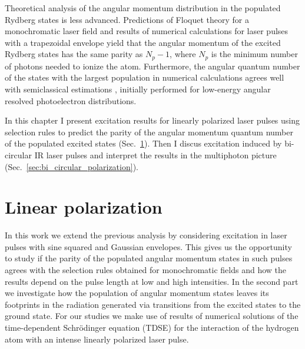 Theoretical analysis of the angular momentum distribution in the populated Rydberg states is less advanced. Predictions of Floquet theory for a monochromatic laser field \cite{krajewska12} and results of numerical calculations for laser pulses with a trapezoidal envelope \cite{piraux17} yield that the angular momentum of the excited Rydberg states has the same parity as $N_p-1$, where $N_p$ is the minimum number of photons needed to ionize the atom. Furthermore, the angular quantum number of the states with the largest population in numerical calculations \cite{li14,li14b,piraux17} agrees well with semiclassical estimations \cite{arbo08}, initially performed for low-energy angular resolved photoelectron distributions.

In this chapter I present excitation results for linearly polarized laser pulses using selection rules to predict the parity of the angular momentum quantum number of the populated excited states (Sec.~\ref{sec:linear_polarization}). Then I discus excitation induced by bi-circular IR laser pulses and interpret the results in the multiphoton picture (Sec.~\ref{sec:bi_circular_polarization}). 

\section{Linear polarization} %
\label{sec:linear_polarization}

In this work we extend the previous analysis by considering excitation in laser pulses with sine squared and Gaussian envelopes. This gives us the opportunity to study if the parity of the populated angular momentum states in such pulses agrees with the selection rules obtained for monochromatic fields and how the results depend on the pulse length at low and high intensities. In the second part we investigate how the population of angular momentum states leaves its footprints in the radiation generated via transitions from the excited states to the ground state. For our studies we make use of results of numerical solutions of the time-dependent Schr\"odinger equation (TDSE) for the interaction of the hydrogen atom with an intense linearly polarized laser pulse.

